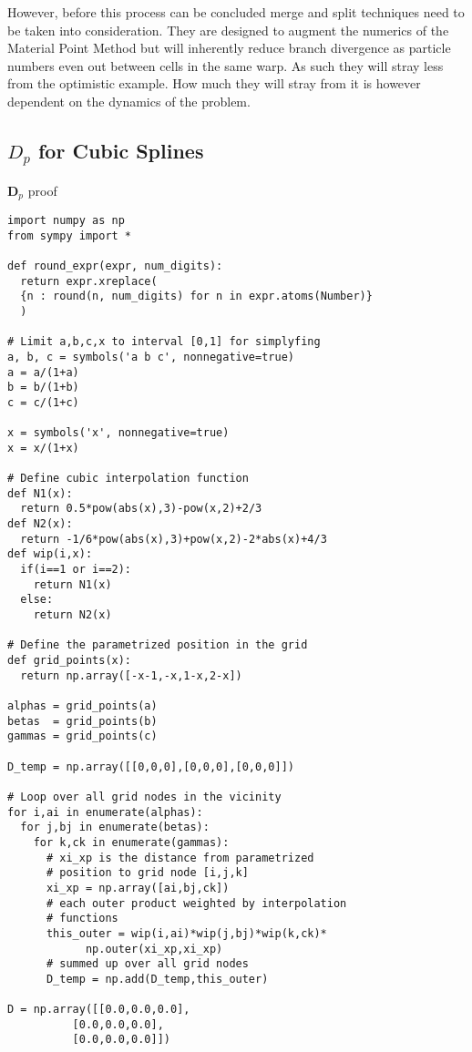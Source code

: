 \documentclass[m,times]{cgMA}
\newenvironment{code}{\captionsetup{type=algorithm}}{}
\begin{document}
However, before this process can be concluded merge and split techniques need to be taken into consideration. They are designed to augment the numerics of the Material Point Method but will inherently reduce branch divergence as particle numbers even out between cells in the same warp. As such they will stray less from the optimistic example. How much they will stray from it is however dependent on the dynamics of the problem.
\clearpage
\begin{appendices}
\section{$D_p$ for Cubic Splines}\label{app:dp_proof}
  \begin{code}
\caption{$\boldsymbol{D}_p$ proof}
  \begin{verbatim}
import numpy as np
from sympy import *

def round_expr(expr, num_digits):
  return expr.xreplace(
  {n : round(n, num_digits) for n in expr.atoms(Number)}
  )

# Limit a,b,c,x to interval [0,1] for simplyfing
a, b, c = symbols('a b c', nonnegative=true)
a = a/(1+a)
b = b/(1+b)
c = c/(1+c)

x = symbols('x', nonnegative=true)
x = x/(1+x)

# Define cubic interpolation function
def N1(x):
  return 0.5*pow(abs(x),3)-pow(x,2)+2/3
def N2(x):
  return -1/6*pow(abs(x),3)+pow(x,2)-2*abs(x)+4/3
def wip(i,x):
  if(i==1 or i==2):
    return N1(x)
  else:
    return N2(x)

# Define the parametrized position in the grid
def grid_points(x):
  return np.array([-x-1,-x,1-x,2-x])

alphas = grid_points(a)
betas  = grid_points(b)
gammas = grid_points(c)

D_temp = np.array([[0,0,0],[0,0,0],[0,0,0]])

# Loop over all grid nodes in the vicinity
for i,ai in enumerate(alphas):
  for j,bj in enumerate(betas):
    for k,ck in enumerate(gammas):
      # xi_xp is the distance from parametrized
      # position to grid node [i,j,k]
      xi_xp = np.array([ai,bj,ck])
      # each outer product weighted by interpolation
      # functions
      this_outer = wip(i,ai)*wip(j,bj)*wip(k,ck)*
		    np.outer(xi_xp,xi_xp)
      # summed up over all grid nodes
      D_temp = np.add(D_temp,this_outer)

D = np.array([[0.0,0.0,0.0],
	      [0.0,0.0,0.0],
	      [0.0,0.0,0.0]])


\end{verbatim}
\end{code}
\end{appendices}
\end{document}
